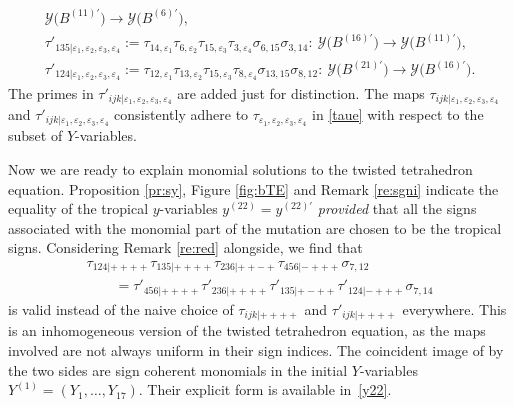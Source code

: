 \documentclass[pdftex]{sigma}
\newcommand\bY{Y}
\numberwithin{equation}{section}
\begin{document}
\begin{gather*}
 \mathcal{Y}\bigl(B^{(11)\prime}\bigr) \rightarrow \mathcal{Y}\bigl(B^{(6)\prime}\bigr),
\\
\tau'_{135 | \varepsilon_1,\varepsilon_2,\varepsilon_3,\varepsilon_4} :=
\tau_{14,\varepsilon_1}\tau_{6,\varepsilon_2}\tau_{15,\varepsilon_3}\tau_{3,\varepsilon_4}\sigma_{6,15}\sigma_{3,14}\colon\
 \mathcal{Y}\bigl(B^{(16)\prime}\bigr) \rightarrow \mathcal{Y}\bigl(B^{(11)\prime}\bigr),
\\
\tau'_{124 | \varepsilon_1,\varepsilon_2,\varepsilon_3,\varepsilon_4} :=
\tau_{12,\varepsilon_1}\tau_{13,\varepsilon_2}\tau_{15,\varepsilon_3}\tau_{8,\varepsilon_4}\sigma_{13,15}\sigma_{8,12}\colon\
 \mathcal{Y}\bigl(B^{(21)\prime}\bigr) \rightarrow \mathcal{Y}\bigl(B^{(16)\prime}\bigr).
\end{gather*}
The primes in $\tau'_{\!ijk | \varepsilon_1,\varepsilon_2,\varepsilon_3,\varepsilon_4}$
are added just for distinction.
The maps $\tau_{\!ijk | \varepsilon_1,\varepsilon_2,\varepsilon_3,\varepsilon_4}$ and
$\tau'_{\!ijk | \varepsilon_1,\varepsilon_2,\varepsilon_3,\varepsilon_4}$
consistently adhere to $\tau_{\varepsilon_1,\varepsilon_2,\varepsilon_3,\varepsilon_4}$ in
\eqref{taue} with respect to the subset of $Y$-variables.

Now we are ready to explain monomial solutions to the twisted tetrahedron equation.
Proposition \ref{pr:sy}, Figure \ref{fig:bTE} and Remark \ref{re:sgni} indicate
the equality of the tropical $y$-variables $y^{(22)} = y^{(22)\prime}$ {\em provided} that
all the signs associated with the monomial part of the mutation are chosen to be the tropical signs.
Considering Remark \ref{re:red} alongside, we find that
\begin{gather}
\tau_{124| + + + +} \tau_{135| + + + +}\tau_{236| + + - +}\tau_{456| - + + +}\sigma_{7,12}\nonumber\\
\qquad
=
\tau'_{456| + + + +}\tau'_{236| + + + +}\tau'_{135| + - + +}\tau'_{124| - + + +}\sigma_{7,14}\label{ihte}
\end{gather}
is valid instead of the naive choice of $\tau_{ijk| ++++}$ and $\tau'_{ijk| ++++}$ everywhere.
This is an inhomogeneous version of the twisted tetrahedron equation,
as the maps involved are not always uniform in their sign indices.
%
The coincident image of \smash{$Y^{(22)}_1, \dots, Y^{(22)}_{17}$} by the
two sides are sign coherent monomials in the initial $Y$-variables
$\bY^{(1)} = (Y_1,\dotsc, Y_{17})$. Their explicit form is available
in~\eqref{y22}.
\end{document}
